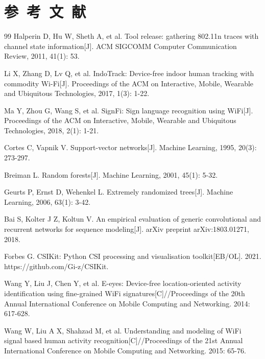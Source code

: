 ﻿%

\song\wuhao
\linespread{1.25}
\chapter*{\hfill 参~考~文~献 \hfill}
\label{reference}

\begin{thebibliography}{99}
Halperin D, Hu W, Sheth A, et al. Tool release: gathering 802.11n traces with channel state information[J]. ACM SIGCOMM Computer Communication Review, 2011, 41(1): 53.

Li X, Zhang D, Lv Q, et al. IndoTrack: Device-free indoor human tracking with commodity Wi-Fi[J]. Proceedings of the ACM on Interactive, Mobile, Wearable and Ubiquitous Technologies, 2017, 1(3): 1-22.

Ma Y, Zhou G, Wang S, et al. SignFi: Sign language recognition using WiFi[J]. Proceedings of the ACM on Interactive, Mobile, Wearable and Ubiquitous Technologies, 2018, 2(1): 1-21.

Cortes C, Vapnik V. Support-vector networks[J]. Machine Learning, 1995, 20(3): 273-297.

Breiman L. Random forests[J]. Machine Learning, 2001, 45(1): 5-32.

Geurts P, Ernst D, Wehenkel L. Extremely randomized trees[J]. Machine Learning, 2006, 63(1): 3-42.

Bai S, Kolter J Z, Koltun V. An empirical evaluation of generic convolutional and recurrent networks for sequence modeling[J]. arXiv preprint arXiv:1803.01271, 2018.

Forbes G. CSIKit: Python CSI processing and visualisation toolkit[EB/OL]. 2021. https://github.com/Gi-z/CSIKit.

Wang Y, Liu J, Chen Y, et al. E-eyes: Device-free location-oriented activity identification using fine-grained WiFi signatures[C]//Proceedings of the 20th Annual International Conference on Mobile Computing and Networking. 2014: 617-628.

Wang W, Liu A X, Shahzad M, et al. Understanding and modeling of WiFi signal based human activity recognition[C]//Proceedings of the 21st Annual International Conference on Mobile Computing and Networking. 2015: 65-76.


\end{thebibliography}
